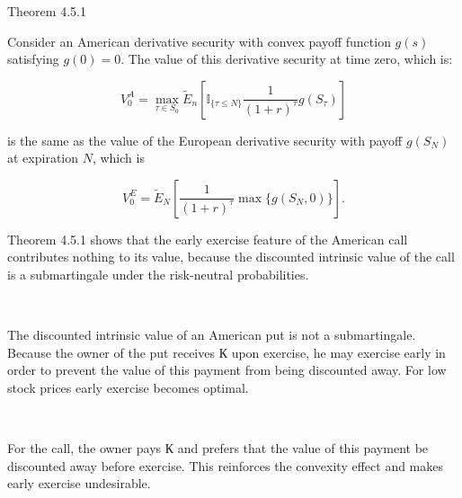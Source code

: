 \documentclass[c, dvipsnames, 8pt]{beamer}
\begin{document}
\begin{frame}[shrink=5]
\frametitle{\insertsection} 
\framesubtitle{\insertsubsection} 

\begin{block}{Theorem 4.5.1}

Consider an American derivative
security with convex payoff function $g(s)$ satisfying $g(0) = 0$. The value of this  derivative security at time zero, which is:

\begin{equation}\label{q}
V_0^A = \max_{\tau \in S_0} \tilde{E}_n [\mathbb{I}_{\{\tau \leq N\}} \dfrac{1}{(1+r)^{\tau}} g(S_{\tau})]
\end{equation}

is the same as the value of the European derivative security with payoff $g(S_N)$ 	at expiration $N$, which is 

\begin{equation}\label{q}
V_0^E =  \tilde{E}_N \left[ \dfrac{1}{(1+r)^{\tau}} \max \{ g(S_{N}, 0 )\}\right].
\end{equation}


\end{block}

Theorem 4.5.1 shows that the early exercise feature of the American call
contributes nothing to its value, because the discounted intrinsic value of the call is a submartingale under the risk-neutral probabilities.

\

The discounted intrinsic value of an American put is not a submartingale. 
Because the owner of the put receives
$К$ upon exercise, he may exercise early in order to prevent the value of this
payment from being discounted away. For low stock prices early exercise becomes optimal. 

\

For the call, the owner pays $К$ and prefers that the value of this payment
be discounted away before exercise. This reinforces the convexity effect and
makes early exercise undesirable.



\end{frame}	
	
\end{document}
